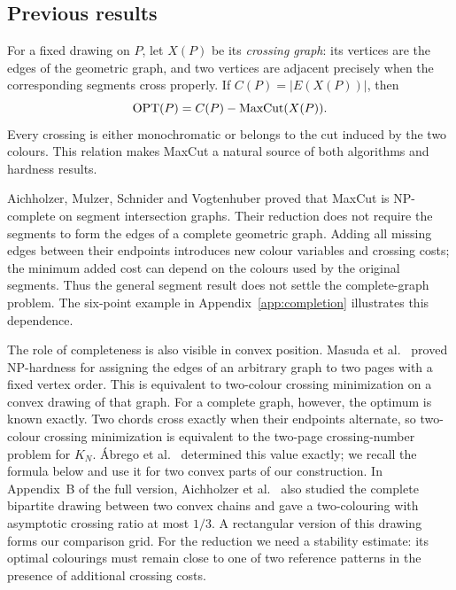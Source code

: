 \subsection{Previous results}

For a fixed drawing on $P$, let $X(P)$ be its \emph{crossing graph}: its
vertices are the edges of the geometric graph, and two vertices are
adjacent precisely when the corresponding segments cross properly.
If $C(P)=|E(X(P))|$, then
\begin{equation}\label{eq:crossing-maxcut}
 \operatorname{OPT}(P)=C(P)-\operatorname{MaxCut}(X(P)).
\end{equation}
Every crossing is either monochromatic or belongs to the cut induced by
the two colours. This relation makes MaxCut a natural source of both
algorithms and hardness results.

Aichholzer, Mulzer, Schnider and Vogtenhuber \cite{Aichholzer2018} proved
that MaxCut is NP-complete on segment intersection graphs. Their reduction
does not require the segments to form the edges of a complete geometric
graph. Adding all missing edges between their endpoints introduces new
colour variables and crossing costs; the minimum added cost can depend on
the colours used by the original segments. Thus the general segment result
does not settle the complete-graph problem. The six-point example in
Appendix~\ref{app:completion} illustrates this dependence.

The role of completeness is also visible in convex position. Masuda
et al.\ \cite{Masuda1990} proved NP-hardness for assigning the edges of
an arbitrary graph to two pages with a fixed vertex order. This is
equivalent to two-colour crossing minimization on a convex drawing of
that graph. For a complete graph, however, the optimum is known exactly.
Two chords cross
exactly when their endpoints alternate, so two-colour crossing
minimization is equivalent to the two-page crossing-number problem for
$K_N$. \'{A}brego et al.\ \cite{Abrego2013} determined this value exactly;
we recall the formula below and use it for two convex parts of our
construction. In Appendix~B of the full version, Aichholzer et al.\
\cite{Aichholzer2019} also studied the complete bipartite drawing between two convex chains and
gave a two-colouring with asymptotic crossing ratio at most $1/3$.
A rectangular version of this drawing forms our comparison grid.
For the reduction we need a stability estimate: its optimal colourings
must remain close to one of two reference patterns in the presence of
additional crossing costs.

